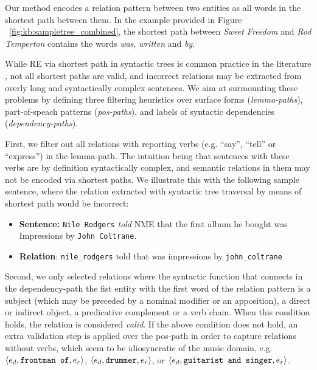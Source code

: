 Our method encodes a relation pattern between two entities as all words in the shortest path between them. In the example provided in Figure ~\ref{fig:kb:sampletree_combined}, the shortest path between \emph{Sweet Freedom} and \emph{Rod Temperton} contains the words \textit{was}, \textit{written} and \textit{by}.

While RE via shortest path in syntactic trees is common practice in the literature \cite{DelliBovietal2015b,MoroandNavigli2012,Nakasholeetal2012}, not all shortest paths are valid, and incorrect relations may be extracted from overly long and syntactically complex sentences. We aim at surmounting these problems by defining three filtering heuristics over surface forms (\textit{lemma-paths}), part-of-speach patterns (\textit{pos-paths}), and labels of syntactic dependencies (\textit{dependency-paths}).

First, we filter out all relations with reporting verbs (e.g. ``say'', ``tell'' or ``express'') in the lemma-path. The intuition being that sentences with these verbs are by definition syntactically complex, and semantic relations in them may not be encoded via shortest paths. We illustrate this with the following sample sentence, where the relation extracted with syntactic tree traversal by means of shortest path would be incorrect:

\begin{itemize}
\item[] \textbf{Sentence:} \texttt{Nile Rodgers} \textit{told} NME that the first album he bought was Impressions by \texttt{John Coltrane}.
\item[] \textbf{Relation}: \texttt{nile\_rodgers} told that was impressions by \texttt{john\_coltrane}
\end{itemize}

Second, we only selected relations where the syntactic function that connects in the dependency-path the fist entity with the first word of the relation pattern is a subject (which may be preceded by a nominal modifier or an apposition), a direct or indirect object, a predicative complement or a verb chain. When this condition holds, the relation is considered \textit{valid}. If the above condition does not hold, an extra validation step is applied over the pos-path in order to capture relations without verbs, which seem to be idiosyncratic of the music domain, e.g. $\langle e_d, \mbox{\texttt{frontman of}}, e_r \rangle$, $\langle e_d, \mbox{\texttt{drummer}}, e_r \rangle$, or $\langle e_d, \mbox{\texttt{guitarist and singer}}, e_r \rangle$.

